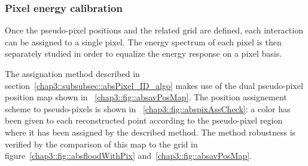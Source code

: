 \subsubsection{Pixel energy calibration}\label{chap3::subsubsec::absPixelEcal}

Once the pseudo-pixel positions and the related grid are defined, each interaction can be assigned to a single pixel. The energy spectrum of each pixel is then separately studied in order to equalize the energy response on a pixel basis.

The assignation method described in section~\ref{chap3::subsubsec::absPixel_ID_algo} makes use of the dual pseudo-pixel position map shown in \figurename~\ref{chap3::fig::absavPosMap}. 
The position assignement scheme to pseudo-pixels is shown in \figurename~\ref{chap3::fig::abspixAssCheck}: a color has been given to each reconstructed point according to the pseudo-pixel region where it has been assigned by the described method. The method robustness is verified by the comparison of this map to the grid in figure~\ref{chap3::fig::absfloodWithPix} and~\ref{chap3::fig::absavPosMap}.   



